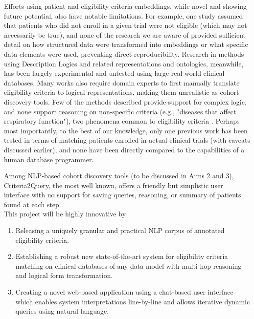 \documentclass[../main.tex]{subfiles}
\begin{document}
Efforts using patient and eligibility criteria embeddings, while novel and showing future potential, also have notable limitations. For example, one study assumed that patients who did not enroll in a given trial were not eligible \cite{zhang2020deepenroll} (which may not necessarily be true), and none of the research we are aware of provided sufficient detail on how structured data were transformed into embeddings or what specific data elements were used, preventing direct reproducibility. Research in methods using Description Logics and related representations and ontologies, meanwhile, has been largely experimental and untested using large real-world clinical databases. Many works also require domain experts to first manually translate eligibility criteria to logical representations, making them unrealistic as cohort discovery tools. 
Few of the methods described provide support for complex logic, and none support reasoning on non-specific criteria (e.g., "diseases that affect respiratory function"), two phenomena common to eligibility criteria \cite{wang2017classifying, ross2010analysis}. Perhaps most importantly, to the best of our knowledge, only one previous work has been tested in terms of matching patients enrolled in actual clinical trials \cite{zhang2020deepenroll} (with caveats discussed earlier), and none have been directly compared to the capabilities of a human database programmer. 

Among NLP-based cohort discovery tools (to be discussed in Aims 2 and 3), Criteria2Query, the most well known, offers a friendly but simplistic user interface with no support for saving queries, reasoning, or summary of patients found at each step. \\

\noindent This project will be highly innovative by

\begin{enumerate}
    \itemsep0em 
    \item Releasing a uniquely granular and practical NLP corpus of annotated eligibility criteria.
    \item Establishing a robust new state-of-the-art system for eligibility criteria matching on clinical databases of any data model with multi-hop reasoning and logical form transformation.
    \item Creating a novel web-based application using a chat-based user interface which enables system interpretations line-by-line and allows iterative dynamic queries using natural language.
\end{enumerate}
\end{document}
